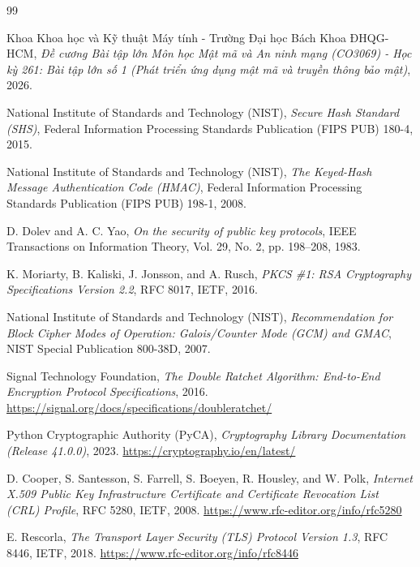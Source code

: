 \documentclass[a4paper,12pt]{article}
\begin{document}
\newpage
\begin{thebibliography}{99}

Khoa Khoa học và Kỹ thuật Máy tính - Trường Đại học Bách Khoa ĐHQG-HCM, \textit{Đề cương Bài tập lớn Môn học Mật mã và An ninh mạng (CO3069) - Học kỳ 261: Bài tập lớn số 1 (Phát triển ứng dụng mật mã và truyền thông bảo mật)}, 2026.

National Institute of Standards and Technology (NIST), \textit{Secure Hash Standard (SHS)}, Federal Information Processing Standards Publication (FIPS PUB) 180-4, 2015.

National Institute of Standards and Technology (NIST), \textit{The Keyed-Hash Message Authentication Code (HMAC)}, Federal Information Processing Standards Publication (FIPS PUB) 198-1, 2008.

D. Dolev and A. C. Yao, \textit{On the security of public key protocols}, IEEE Transactions on Information Theory, Vol. 29, No. 2, pp. 198--208, 1983.

K. Moriarty, B. Kaliski, J. Jonsson, and A. Rusch, \textit{PKCS \#1: RSA Cryptography Specifications Version 2.2}, RFC 8017, IETF, 2016.

National Institute of Standards and Technology (NIST), \textit{Recommendation for Block Cipher Modes of Operation: Galois/Counter Mode (GCM) and GMAC}, NIST Special Publication 800-38D, 2007.

Signal Technology Foundation, \textit{The Double Ratchet Algorithm: End-to-End Encryption Protocol Specifications}, 2016. \url{https://signal.org/docs/specifications/doubleratchet/}

Python Cryptographic Authority (PyCA), \textit{Cryptography Library Documentation (Release 41.0.0)}, 2023. \url{https://cryptography.io/en/latest/}

D. Cooper, S. Santesson, S. Farrell, S. Boeyen, R. Housley, and W. Polk, \textit{Internet X.509 Public Key Infrastructure Certificate and Certificate Revocation List (CRL) Profile}, RFC 5280, IETF, 2008. \url{https://www.rfc-editor.org/info/rfc5280}

E. Rescorla, \textit{The Transport Layer Security (TLS) Protocol Version 1.3}, RFC 8446, IETF, 2018. \url{https://www.rfc-editor.org/info/rfc8446}

\end{thebibliography}
\end{document}
